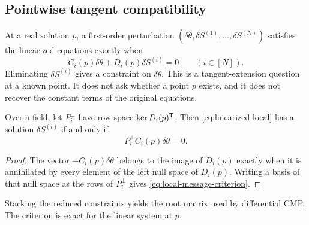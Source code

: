 \subsection{Pointwise tangent compatibility}

At a real solution \(p\), a first-order perturbation
\((\delta\theta,\delta S^{(1)},\ldots,\delta S^{(N)})\) satisfies the
linearized equations exactly when
\begin{equation}
  C_i(p)\delta\theta+D_i(p)\delta S^{(i)}=0
  \qquad (i\in[N]).
  \label{eq:linearized-local}
\end{equation}
Eliminating \(\delta S^{(i)}\) gives a constraint on
\(\delta\theta\).  This is a tangent-extension question at a known point.  It
does not ask whether a point \(p\) exists, and it does not recover the constant
terms of the original equations.

\begin{proposition}
\label{prop:local-linear-extension}
Over a field, let \(P_i^\perp\) have row space
\(\operatorname{ker} D_i(p)^{\mathsf T}\).  Then
\cref{eq:linearized-local} has a solution \(\delta S^{(i)}\) if and only if
\begin{equation}
  P_i^\perp C_i(p)\delta\theta=0.
  \label{eq:local-message-criterion}
\end{equation}
\end{proposition}

\begin{proof}
The vector \(-C_i(p)\delta\theta\) belongs to the image of \(D_i(p)\) exactly
when it is annihilated by every element of the left null space of \(D_i(p)\).
Writing a basis of that null space as the rows of \(P_i^\perp\) gives
\cref{eq:local-message-criterion}.
\end{proof}

Stacking the reduced constraints yields the root matrix used by differential
CMP.  The criterion is exact for the linear system at \(p\).
